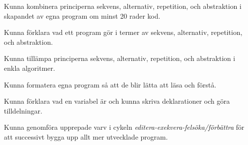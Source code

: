 
\item Kunna kombinera principerna sekvens, alternativ, repetition, och abstraktion i skapandet av egna program om minst 20 rader kod.
\item Kunna förklara vad ett program gör i termer av sekvens, alternativ, repetition, och abstraktion.
\item Kunna tillämpa principerna sekvens, alternativ, repetition, och abstraktion i enkla algoritmer.
\item Kunna formatera egna program så att de blir lätta att läsa och förstå.
\item Kunna förklara vad en variabel är och kunna skriva deklarationer och göra tilldelningar.
\item Kunna genomföra upprepade varv i cykeln \emph{editera-exekvera-felsöka/förbättra} för att successivt bygga upp allt mer utvecklade program.
